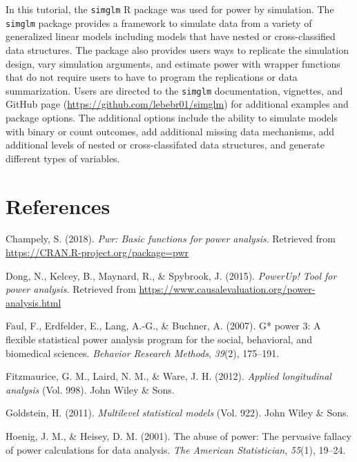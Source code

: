 \documentclass[man,mask,floatsintext]{apa6}
\begin{document}
In this tutorial, the \texttt{simglm} R package was used for power by simulation. The \texttt{simglm} package provides a framework to simulate data from a variety of generalized linear models including models that have nested or cross-classified data structures. The package also provides users ways to replicate the simulation design, vary simulation arguments, and estimate power with wrapper functions that do not require users to have to program the replications or data summarization. Users are directed to the \texttt{simglm} documentation, vignettes, and GitHub page (\url{https://github.com/lebebr01/simglm}) for additional examples and package options. The additional options include the ability to simulate models with binary or count outcomes, add additional missing data mechanisms, add additional levels of nested or cross-classifated data structures, and generate different types of variables.

\newpage

\hypertarget{references}{%
\section{References}\label{references}}

\begingroup
\setlength{\parindent}{-0.5in}
\setlength{\leftskip}{0.5in}

\hypertarget{refs}{}
\leavevmode\hypertarget{ref-pwr}{}%
Champely, S. (2018). \emph{Pwr: Basic functions for power analysis}. Retrieved from \url{https://CRAN.R-project.org/package=pwr}

\leavevmode\hypertarget{ref-powerup}{}%
Dong, N., Kelcey, B., Maynard, R., \& Spybrook, J. (2015). \emph{PowerUp! Tool for power analysis}. Retrieved from \url{https://www.causalevaluation.org/power-analysis.html}

\leavevmode\hypertarget{ref-faul2007}{}%
Faul, F., Erdfelder, E., Lang, A.-G., \& Buchner, A. (2007). G* power 3: A flexible statistical power analysis program for the social, behavioral, and biomedical sciences. \emph{Behavior Research Methods}, \emph{39}(2), 175--191.

\leavevmode\hypertarget{ref-fitzmaurice2012}{}%
Fitzmaurice, G. M., Laird, N. M., \& Ware, J. H. (2012). \emph{Applied longitudinal analysis} (Vol. 998). John Wiley \& Sons.

\leavevmode\hypertarget{ref-goldstein2011}{}%
Goldstein, H. (2011). \emph{Multilevel statistical models} (Vol. 922). John Wiley \& Sons.

\leavevmode\hypertarget{ref-hoenig2001}{}%
Hoenig, J. M., \& Heisey, D. M. (2001). The abuse of power: The pervasive fallacy of power calculations for data analysis. \emph{The American Statistician}, \emph{55}(1), 19--24.
\end{document}
